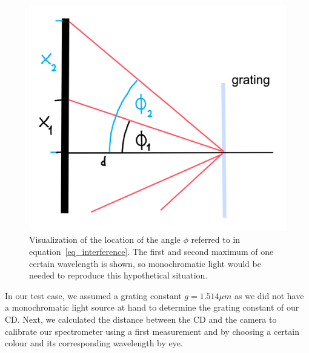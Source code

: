     \begin{figure}[H]
        \centering
        \includegraphics[scale = 0.7]{src/images/angle_phi.png}
        \caption{Visualization of the location of the angle $\phi$ referred to in equation~\eqref{eq_interference}.
        The first and second maximum of one certain wavelength is shown, so monochromatic light would be needed to reproduce this hypothetical situation.}
        \label{fig_phi}
    \end{figure}

    In our test case, we assumed a grating constant $g = 1.514 \mu m$ \cite{src_grating_constant} as we did not have a monochromatic light source at hand to determine the grating constant of our CD.
    Next, we calculated the distance between the CD and the camera to calibrate our spectrometer using a first measurement and by choosing a certain colour and its corresponding wavelength by eye.



    